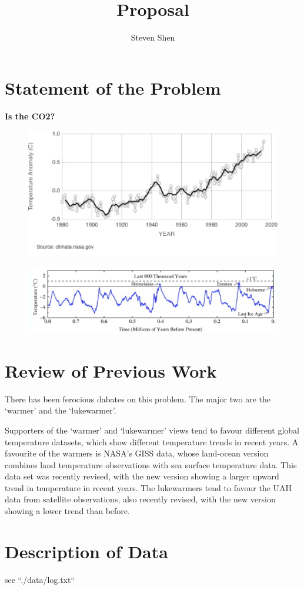 \documentclass[11pt,a4paper]{paper}
\author{Steven Shen \quad \quad}
\title{Proposal}
\begin{document}
\maketitle

\section{Statement of the Problem}

\textbf{Is the CO2?} 


\begin{figure}[!htb]
\centering
\includegraphics[scale=.30]{pic2.png}
\end{figure}

\begin{figure}[!htb]
\centering
\includegraphics[scale=.40]{pic1.png}
\end{figure}

\section{Review of Previous Work}
There has been ferocious dabates on this problem. The major two are the `warmer' and the `lukewarmer'.


Supporters of the `warmer’ and `lukewarmer’ views tend to favour different global temperature datasets, which show different temperature trends in recent years.  A favourite of the warmers is NASA’s GISS data, whose land-ocean version combines land temperature observations with sea surface temperature data. This data set was recently revised, with the new version showing a larger upward trend in temperature in recent years. The lukewarmers tend to favour the UAH data from satellite observations, also recently revised, with the new version showing a lower trend than before.





\section{Description of Data}
see ``./data/log.txt``
\end{document}

